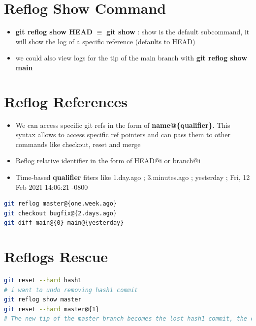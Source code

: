 \documentclass{report}
\begin{document}
\section{Reflog Show Command}

\begin{itemize}
	\item \textbf{git reflog show HEAD} $\equiv$ \textbf{git show} : show is the default subcommand, it will show the log of a specific reference (defaults to HEAD) 
	\item we could also view logs for the tip of the main branch with \textbf{git reflog show main} 
\end{itemize}


\section{Reflog References}

\begin{itemize}
	\item We can access specific git refs in the form of \textbf{name@\{qualifier\}}. This syntax allows to access specific ref pointers and can pass them to other commands like checkout, reset and merge
	\item Reflog relative identifier in the form of HEAD@{i} or branch@{i} 
	\item Time-based \textbf{qualifier} fiters like 1.day.ago ; 3.minutes.ago ; yesterday ; Fri, 12 Feb 2021 14:06:21 -0800
\end{itemize}

\begin{tcolorbox}[title=Time-Based Examples,colback=backcolour]
\begin{lstlisting}[language=bash]
git reflog master@{one.week.ago}
git checkout bugfix@{2.days.ago}
git diff main@{0} main@{yesterday}
\end{lstlisting}
\end{tcolorbox}


\section{Reflogs Rescue}

\begin{tcolorbox}[title=Rescuing,colback=backcolour]
\begin{lstlisting}[language=bash]
git reset --hard hash1
# i want to undo removing hash1 commit
git reflog show master
git reset --hard master@{1}
# The new tip of the master branch becomes the lost hash1 commit, the commit is back !
\end{lstlisting}
\end{tcolorbox}
\end{document}
